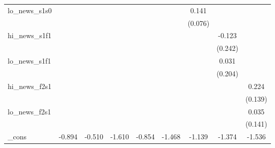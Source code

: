 {\begin{tabular}{l*{8}{c}}
\addlinespace
lo\_news\_s1s0&                     &                     &                     &                     &                     &       0.141\sym{*}  &                     &                     \\
            &                     &                     &                     &                     &                     &     (0.076)         &                     &                     \\
\addlinespace
hi\_news\_s1f1&                     &                     &                     &                     &                     &                     &      -0.123         &                     \\
            &                     &                     &                     &                     &                     &                     &     (0.242)         &                     \\
\addlinespace
lo\_news\_s1f1&                     &                     &                     &                     &                     &                     &       0.031         &                     \\
            &                     &                     &                     &                     &                     &                     &     (0.204)         &                     \\
\addlinespace
hi\_news\_f2s1&                     &                     &                     &                     &                     &                     &                     &       0.224         \\
            &                     &                     &                     &                     &                     &                     &                     &     (0.139)         \\
\addlinespace
lo\_news\_f2s1&                     &                     &                     &                     &                     &                     &                     &       0.035         \\
            &                     &                     &                     &                     &                     &                     &                     &     (0.141)         \\
\addlinespace
\_cons      &      -0.894\sym{*}  &      -0.510         &      -1.610\sym{***}&      -0.854         &      -1.468\sym{***}&      -1.139\sym{***}&      -1.374\sym{***}&      -1.536\sym{***}\\

\end{tabular}}
